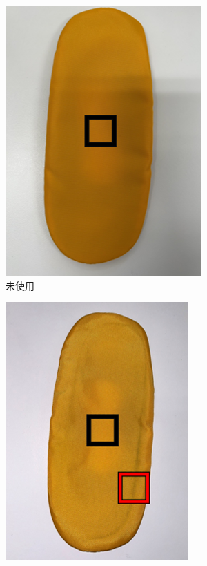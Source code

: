 \documentclass[main]{subfiles}
\begin{document}
\begin{figure}[htbp]
    \centering
    \begin{subfigure}[htbp]{0.3\linewidth}
        \centering
        \includegraphics[keepaspectratio, width=0.8\linewidth, height=\linewidth]{figures/caring_brush_pad/misiyou.png}
        \caption{未使用}
        \label{fig:label}
    \end{subfigure}
    \begin{subfigure}[htbp]{0.3\linewidth}
        \centering
        \includegraphics[keepaspectratio, width=0.8\linewidth, height=\linewidth]{figures/caring_brush_pad/10~15A.png}

\end{subfigure}
\end{figure}
\end{document}
